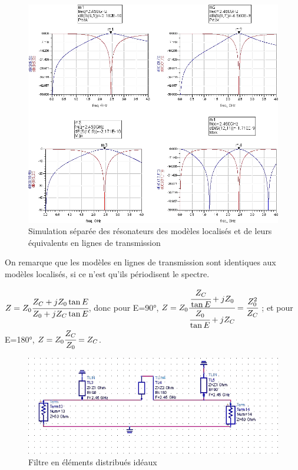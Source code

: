 \documentclass[10pt]{article}
\begin{document}
\begin{figure}
    \begin{center}
        \includegraphics[width=15cm]{p18_Simu}
    \end{center}
    \caption{Simulation séparée des résonateurs des modèles localisés et de leurs équivalents en lignes de transmission}
\end{figure}

On remarque que les modèles en lignes de transmission sont identiques aux modèles localisés, si ce n’est
qu’ils périodisent le spectre.

$Z=Z_0\cfrac{Z_C+jZ_0\tan{E}}{Z_0+jZ_C\tan{E}}$, donc pour E=90°,
$Z=Z_0\cfrac{\cfrac{Z_C}{\tan{E}}+jZ_0}{\cfrac{Z_0}{\tan{E}}+jZ_C} = \cfrac{Z_0^2}{Z_C}$ ; et pour E=180°,
$Z=Z_0\cfrac{Z_C}{Z_0} = Z_C$.

\begin{figure}
    \begin{center}
        \includegraphics{p19_circuit}
    \end{center}
    \caption{Filtre en éléments distribués idéaux}
\end{figure}
\end{document}
